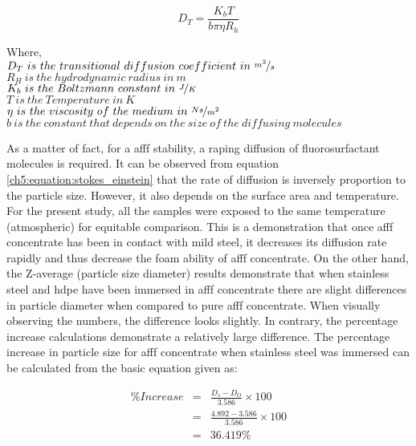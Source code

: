 \begin{equation}
    D_T=\frac{K_bT}{b\pi \eta R_h}
    \label{ch5:equation:stokes_einstein}
\end{equation}

\begin{doublespace}
Where, \\
$D_T\ is\ the\ transitional\ diffusion\ coefficient\ in\ \nicefrac{m^2}{s}$ \\
$R_H\ is\ the\ hydrodynamic\ radius\ in\ m$ \\
$K_b\ is\ the\ Boltzmann\ constant\ in\ \nicefrac{J}{K}$ \\
$T\ is\ the\ Temperature\ in\ K$ \\
$\eta\ is\ the\ viscosity\ of\ the\ medium\ in\ \nicefrac{Ns}{m^2}$ \\
$b\ is\ the\ constant\ that\ depends\ on\ the\ size\ of\ the\ diffusing\ molecules$ \\
\end{doublespace}

As a matter of fact, for a \acrshort{afff} stability, a raping diffusion of fluorosurfactant molecules is required. It can be observed from equation \ref{ch5:equation:stokes_einstein} that the rate of diffusion is inversely proportion to the particle size. However, it also depends on the surface area and temperature. For the present study, all the samples were exposed to the same temperature (atmospheric) for equitable comparison. This is a demonstration that once \acrshort{afff} concentrate has been in contact with mild steel, it decreases its diffusion rate rapidly and thus decrease the foam ability of \acrshort{afff} concentrate.  On the other hand, the Z-average (particle size diameter) results demonstrate that when stainless steel and \acrshort{hdpe} have been immersed in \acrshort{afff} concentrate there are slight differences in particle diameter when compared to pure \acrshort{afff} concentrate. When visually observing the numbers, the difference looks slightly. In contrary, the percentage increase calculations demonstrate a relatively large difference. The percentage increase in particle size for \acrshort{afff} concentrate when stainless steel was immersed can be calculated from the basic equation given as: 

\begin{doublespace}
\begin{eqnarray}
    \%Increase &=& \frac{D_s - D_O}{3.586} \times 100 \\ 
    \nonumber &=& \frac{4.892 - 3.586}{3.586}\times 100 \\
    \nonumber &=& 36.419\%
    \label{ch5:equation:stainless_steel}
\end{eqnarray}
\end{doublespace}

